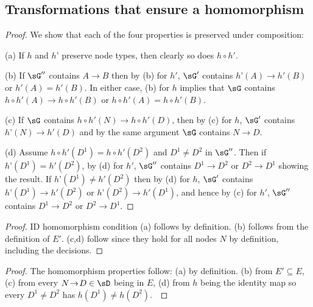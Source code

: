 \subsection{Transformations that ensure a homomorphism} \label{app:ensure-cidhom}
\lecidhomcomposition*%

\begin{proof} We show that each of the four properties is preserved under composition:

(a) If $h$ and $h’$ preserve node types, then clearly so does $h \circ h'$. 

(b) If $\sG''$ contains $A \to B$ then by (b) for $h'$, 
$\sG'$ contains $h’(A)\to h'(B)$ or $h'(A)=h'(B)$. 
In either case, (b) for $h$ implies that
$\sG$ contains $h\circ h'(A) \to h\circ h'(B)$ or $h\circ h'(A) = h\circ h'(B)$.

(c) If $\sG$ contains $h\circ h'(N) \to h\circ h'(D)$, then by (c) for $h$, $\sG'$ contains $h’(N) \to h'(D)$ and by the same argument 
$\sG$ contains $N\to D$.

(d) Assume $h\circ h'(D^1)=h\circ h'(D^2)$ and $D^1\!\neq\! D^2$ in $\sG''$. 
Then if $h’(D^1)\!=\!h'(D^2)$, by (d) for $h'$, 
$\sG''$ contains
$D^1\!\to\! D^2$ or $D^2\!\to\! D^1$ showing the result. 
If $h’(D^1)\neq h'(D^2)$ then by (d) for $h$, 
$\sG'$ contains $h’(D^1)\to h'(D^2)$ or $h’(D^2) \to h'(D^1)$, and hence by (c) for $h'$, $\sG''$ contains $D^1 \to D^2$ or $D^2\to D^1$.
\end{proof}































\lecopyingcidhom*
{}

\begin{proof}
ID homomorphism condition (a) follows by definition. (b) follows from the definition of $E'$. (c,d) follow since they hold for all nodes $N$ by definition, including the decisions.
\end{proof}




\lepruningcidhom*

\begin{proof}
The homomorphism properties follow:
(a) by definition. (b) from $E'\!\subseteq\! E$, (c) from every $N\!\to\! D \in \sD$ 
being in $E$, (d) from $h$ being the identity map so every $D^1\!\neq\! D^2$ has $h(D^1)\!\neq\! h(D^2)$.~
\end{proof}